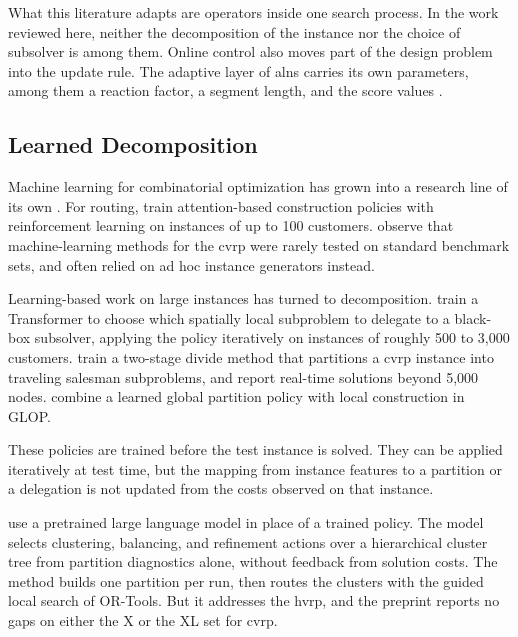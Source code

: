 What this literature adapts are operators inside one search process. In the work reviewed here, neither the decomposition of the instance nor the choice of subsolver is among them. Online control also moves part of the design problem into the update rule. The adaptive layer of \gls{alns} carries its own parameters, among them a reaction factor, a segment length, and the score values \citep{ropkeAdaptiveLargeNeighborhood2006}.

\subsection{Learned Decomposition}\label{sec:lit-learned-decomposition}

Machine learning for combinatorial optimization has grown into a research line of its own \citep{bengio2021machine}. For routing, \citet{kool2019attention} train attention-based construction policies with reinforcement learning on instances of up to 100 customers. \citet{queirogaXLInstancesCapacitated2026} observe that machine-learning methods for the \gls{cvrp} were rarely tested on standard benchmark sets, and often relied on ad hoc instance generators instead.

Learning-based work on large instances has turned to decomposition. \citet{liLearningDelegate2021} train a Transformer to choose which spatially local subproblem to delegate to a black-box subsolver, applying the policy iteratively on instances of roughly 500 to 3{,}000 customers. \citet{houGeneralizeLearnedHeuristics2023} train a two-stage divide method that partitions a \gls{cvrp} instance into traveling salesman subproblems, and report real-time solutions beyond 5{,}000 nodes. \citet{yeGLOP2024} combine a learned global partition policy with local construction in GLOP\@.

These policies are trained before the test instance is solved. They can be applied iteratively at test time, but the mapping from instance features to a partition or a delegation is not updated from the costs observed on that instance.

\citet{karaahmetogluAdaptiveClusterFirst2026} use a pretrained large language model in place of a trained policy. The model selects clustering, balancing, and refinement actions over a hierarchical cluster tree from partition diagnostics alone, without feedback from solution costs. The method builds one partition per run, then routes the clusters with the guided local search of OR-Tools. But it addresses the \gls{hvrp}, and the preprint reports no gaps on either the X or the XL set for \gls{cvrp}.

